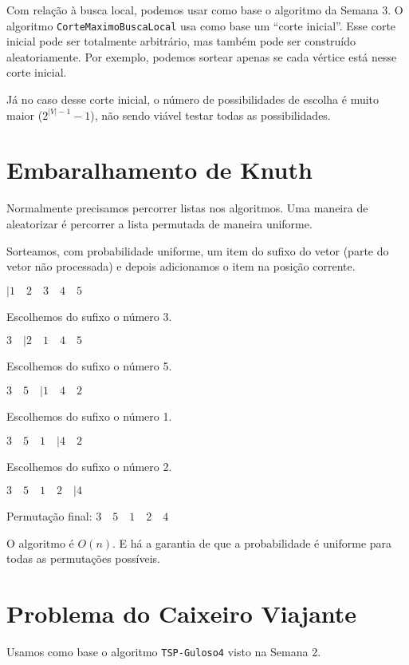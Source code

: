 Com relação à busca local, podemos usar como base o algoritmo da Semana 3. O algoritmo \lstinline{CorteMaximoBuscaLocal} usa como base um ``corte inicial''. Esse corte inicial pode ser totalmente arbitrário, mas também pode ser construído aleatoriamente. Por exemplo, podemos sortear apenas se cada vértice está nesse corte inicial.

Já no caso desse corte inicial, o número de possibilidades de escolha é muito maior ($2^{|V|-1}-1$), não sendo viável testar todas as possibilidades.

\section{Embaralhamento de Knuth}

Normalmente precisamos percorrer listas nos algoritmos. Uma maneira de aleatorizar é percorrer a lista permutada de maneira uniforme.

Sorteamos, com probabilidade uniforme, um item do sufixo do vetor (parte do vetor não processada) e depois adicionamos o item na posição corrente.

\begin{example}
    $|1 \quad 2 \quad 3 \quad 4 \quad 5$

    Escolhemos do sufixo o número 3.

    $3 \quad |2 \quad 1 \quad 4 \quad 5$

    Escolhemos do sufixo o número 5.

    $3 \quad 5 \quad |1 \quad 4 \quad 2$

    Escolhemos do sufixo o número 1.

    $3 \quad 5 \quad 1 \quad |4 \quad 2$

    Escolhemos do sufixo o número 2.

    $3 \quad 5 \quad 1 \quad 2 \quad |4$

    Permutação final: $3 \quad 5 \quad 1 \quad 2 \quad 4$
\end{example}

O algoritmo é $O(n)$. E há a garantia de que a probabilidade é uniforme para todas as permutações possíveis.

\section{Problema do Caixeiro Viajante}

Usamos como base o algoritmo \lstinline{TSP-Guloso4} visto na Semana 2.

\begin{algorithm}
    \SetAlgoLined
\end{algorithm}

